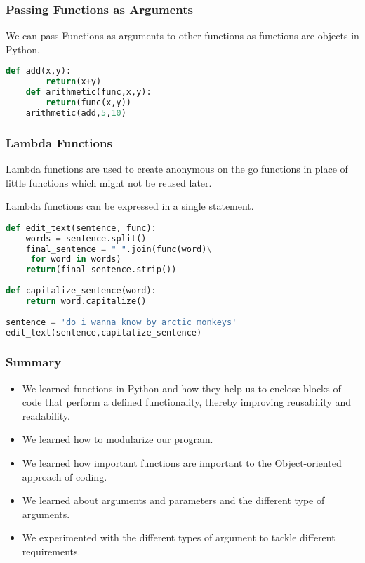 \documentclass{beamer}
\begin{document}
\begin{frame}[fragile]
\frametitle{Passing Functions as Arguments}
We can pass Functions as arguments to other functions as functions are objects in Python.
\begin{lstlisting}[language=Python]
	def add(x,y):
		return(x+y)
	def arithmetic(func,x,y):
		return(func(x,y))
	arithmetic(add,5,10)
\end{lstlisting}
\end{frame}

\begin{frame}[fragile]
\frametitle{Lambda Functions}
Lambda functions are used to create anonymous on the go functions in place of little functions which might not be reused later.

Lambda functions can be expressed in a single statement.
\begin{lstlisting}[language=Python]
def edit_text(sentence, func):
    words = sentence.split()
    final_sentence = " ".join(func(word)\
     for word in words)
    return(final_sentence.strip())
    
def capitalize_sentence(word):
    return word.capitalize()
    
sentence = 'do i wanna know by arctic monkeys'
edit_text(sentence,capitalize_sentence)
\end{lstlisting}
\end{frame}

\begin{frame}
\frametitle{Summary}
\begin{itemize}
\item We learned functions  in Python and how they help us to enclose blocks of code that perform a defined functionality, thereby improving reusability and readability.
\item We learned how to modularize our program.
\item We learned how important functions are important to the Object-oriented approach of coding.
\item We learned about arguments and parameters and the different type of arguments.
\item We experimented with the different types of argument to tackle different requirements.
\end{itemize}
\end{frame}
\end{document}
